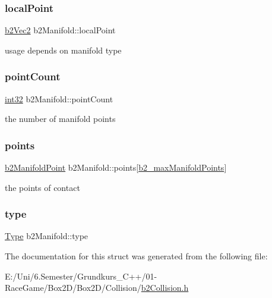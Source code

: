 \subsubsection{\texorpdfstring{localPoint}{localPoint}}
{\footnotesize\ttfamily \mbox{\hyperlink{structb2_vec2}{b2\+Vec2}} b2\+Manifold\+::local\+Point}



usage depends on manifold type 

\mbox{\label{structb2_manifold_abf59ff6fa36bed34b0242ad54951a696}} 
\subsubsection{\texorpdfstring{pointCount}{pointCount}}
{\footnotesize\ttfamily \mbox{\hyperlink{b2_settings_8h_a43d43196463bde49cb067f5c20ab8481}{int32}} b2\+Manifold\+::point\+Count}



the number of manifold points 

\mbox{\label{structb2_manifold_ab8021128e9792cc7391a8804ea02173d}} 
\subsubsection{\texorpdfstring{points}{points}}
{\footnotesize\ttfamily \mbox{\hyperlink{structb2_manifold_point}{b2\+Manifold\+Point}} b2\+Manifold\+::points\mbox{[}\mbox{\hyperlink{b2_settings_8h_aa5f44cc9edf711433dea2b2ec94f3c42}{b2\+\_\+max\+Manifold\+Points}}\mbox{]}}



the points of contact 

\mbox{\label{structb2_manifold_a4cb6ceba7105513b1e5bd6dbf0cce168}} 
\subsubsection{\texorpdfstring{type}{type}}
{\footnotesize\ttfamily \mbox{\hyperlink{structb2_manifold_aa9c347e2ff2e27ee820a926efbb33e12}{Type}} b2\+Manifold\+::type}



The documentation for this struct was generated from the following file\+:\begin{DoxyCompactItemize}
\item 
E\+:/\+Uni/6.\+Semester/\+Grundkurs\+\_\+\+C++/01-\/\+Race\+Game/\+Box2\+D/\+Box2\+D/\+Collision/\mbox{\hyperlink{b2_collision_8h}{b2\+Collision.\+h}}\end{DoxyCompactItemize}
